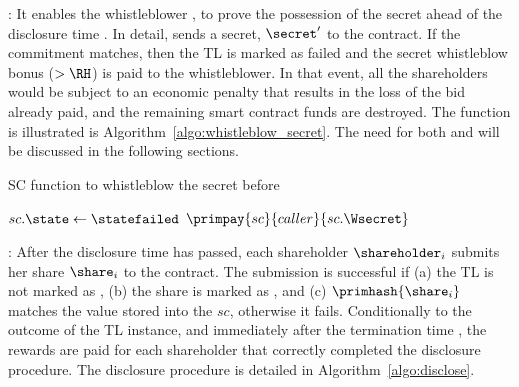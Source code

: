 \smallskip
\texttt{\algowhistleblowsecret}:
It enables the whistleblower \whistleblower, to prove the possession of the secret ahead of the disclosure time \td.
In detail, \whistleblower sends a secret, $\secret'$ to the contract.
If the commitment matches, then the TL is marked as failed and the secret whistleblow bonus \Wsecret ($>\RH$) is paid to the whistleblower.
In that event, all the shareholders would be subject to an economic penalty that results in the loss of the bid already paid, and the remaining smart contract funds are destroyed.
The function is illustrated is Algorithm~\ref{algo:whistleblow_secret}.
The need for both \texttt{\algowhistleblowshare} and \texttt{\algowhistleblowsecret} will be discussed in the following sections.

\begin{algorithm}[t]
	\caption{SC function to whistleblow the secret before \td}\label{algo:whistleblow_secret}
	\begin{algorithmic}[1]
		\vspace{0.6em}
		\State $sc.\state\gets \statefailed$
		\State $\primpay{sc}{caller}{sc.\Wsecret}$
		\EndIf
		\EndIf
		\EndProcedure
	\end{algorithmic}
\end{algorithm}


\smallskip
\texttt{\algodisclose}:
After the disclosure time \td has passed, each shareholder $\shareholder_{i}$ submits her share $\share_{i}$ to the contract.
The submission is successful if (a) the TL is not marked as \statefailed, (b) the share is marked as \statepaid, and (c) $\primhash{\share_i}$ matches the value stored into the $sc$, otherwise it fails.
Conditionally to the outcome of the TL instance, and immediately after the termination time \te, the rewards are paid for each shareholder that correctly completed the disclosure procedure.
The disclosure procedure is detailed in Algorithm~\ref{algo:disclose}.
